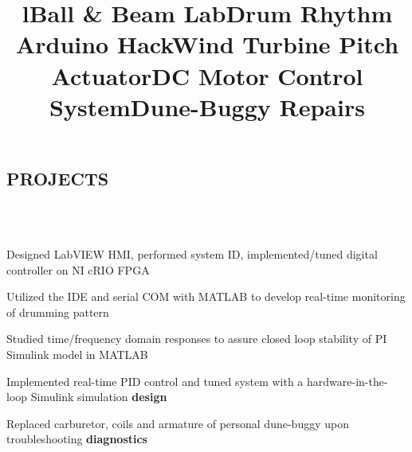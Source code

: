\documentclass[mm]{res}
\newcommand{\tb}{\textbullet \xspace}
\begin{document}
\begin{resume}
\section{PROJECTS \xspace}
\begin{format}
\title{l}\\
\body\\
\end{format}

\title{\textbf{Ball \& Beam Lab}}
\begin{position}
\tb Designed LabVIEW HMI, performed system ID, implemented/tuned digital controller on NI cRIO FPGA
\end{position}

\title{\textbf{Drum Rhythm Arduino Hack}}
\begin{position}
\tb Utilized the IDE and serial COM with MATLAB to develop real-time monitoring of drumming pattern
\end{position}

\title{\textbf{Wind Turbine Pitch Actuator}}
\begin{position}
\tb Studied time/frequency domain responses to assure closed loop stability of PI Simulink model in MATLAB
\end{position}


\title{\textbf{DC Motor Control System}}
\begin{position}
\tb Implemented real-time PID control and tuned system with a hardware-in-the-loop Simulink simulation \textbf{design}
\end{position}

\title{\textbf{Dune-Buggy Repairs}}
\begin{position}
\tb Replaced carburetor, coils and armature of personal dune-buggy upon troubleshooting \textbf{diagnostics}
\end{position}


\end{resume}
\end{document}
